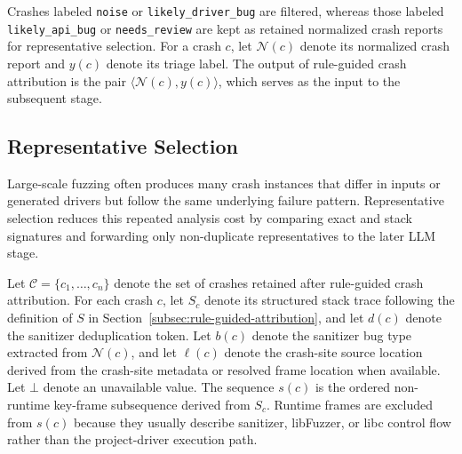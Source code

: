 \documentclass[pdflatex,sn-basic]{sn-jnl}%
\theoremstyle{thmstyleone}%
\theoremstyle{thmstyletwo}%
\theoremstyle{thmstylethree}%
\begin{document}
Crashes labeled \texttt{noise} or \texttt{likely\_driver\_bug} are filtered, whereas those labeled \texttt{likely\_api\_bug} or \texttt{needs\_review} are kept as retained normalized crash reports for representative selection.
For a crash \(c\), let \(\mathcal{N}(c)\) denote its normalized crash report and \(y(c)\) denote its triage label.
The output of rule-guided crash attribution is the pair \(\langle\mathcal{N}(c),y(c)\rangle\), which serves as the input to the subsequent stage.


\subsection{Representative Selection}

Large-scale fuzzing often produces many crash instances that differ in inputs or generated drivers but follow the same underlying failure pattern.
Representative selection reduces this repeated analysis cost by comparing exact and stack signatures and forwarding only non-duplicate representatives to the later LLM stage.

Let \(\mathcal{C}=\{c_1,\ldots,c_n\}\) denote the set of crashes retained after rule-guided crash attribution.
For each crash \(c\), let \(S_c\) denote its structured stack trace following the definition of \(S\) in Section~\ref{subsec:rule-guided-attribution}, and let \(d(c)\) denote the sanitizer deduplication token.
Let \(b(c)\) denote the sanitizer bug type extracted from \(\mathcal{N}(c)\), and let \(\ell(c)\) denote the crash-site source location derived from the crash-site metadata or resolved frame location when available.
Let \(\bot\) denote an unavailable value.
The sequence \(s(c)\) is the ordered non-runtime key-frame subsequence derived from \(S_c\).
Runtime frames are excluded from \(s(c)\) because they usually describe sanitizer, libFuzzer, or libc control flow rather than the project-driver execution path.
\end{document}
